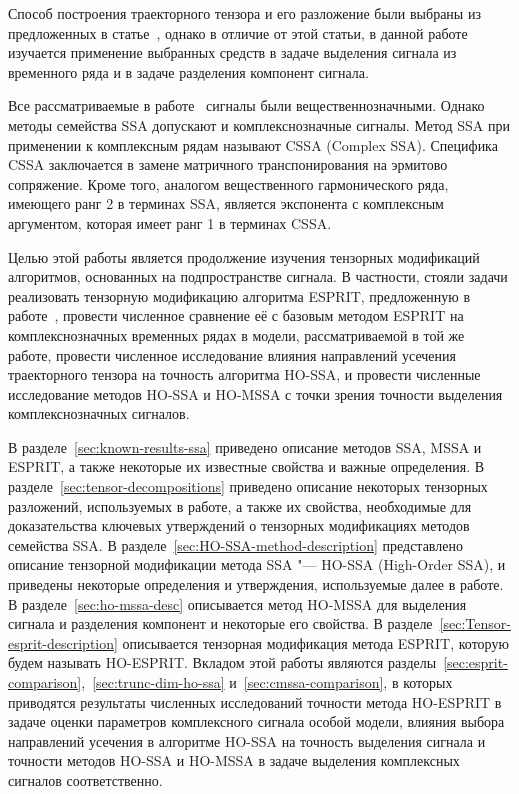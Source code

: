 \documentclass[specialist,
  substylefile=spbu_report.rtx,
subf,href,colorlinks=true, 12pt]{disser}
\theoremstyle{plain}
\theoremstyle{definition}
\theoremstyle{remark}
\begin{document}
Способ построения траекторного тензора и его разложение были
выбраны из предложенных в
статье~\cite{hosvd-hooi-separation}, однако в отличие от этой
статьи, в данной работе изучается применение
выбранных средств в задаче выделения сигнала из временного ряда и в
задаче разделения компонент сигнала.

Все рассматриваемые в работе~\cite{Thesis2024} сигналы были вещественнозначными.
Однако методы семейства SSA допускают и комплекснозначные сигналы.
Метод SSA при применении к комплексным рядам называют CSSA (Complex SSA).
Специфика CSSA заключается в замене матричного
транспонирования на эрмитово сопряжение.
Кроме того, аналогом вещественного гармонического ряда,
имеющего ранг 2 в терминах SSA, является
экспонента с комплексным аргументом, которая
имеет ранг 1 в терминах CSSA.

Целью этой работы является продолжение изучения тензорных модификаций
алгоритмов, основанных на подпространстве сигнала.
В частности, стояли задачи реализовать тензорную модификацию алгоритма
ESPRIT, предложенную в работе~\cite{hosvd-hooi-separation},
провести численное сравнение её с базовым методом
ESPRIT на комплекснозначных временных рядах в модели, рассматриваемой
в той же работе,
провести численное исследование влияния направлений
усечения траекторного тензора на точность алгоритма HO-SSA,
и провести численные исследование методов HO-SSA
и HO-MSSA с точки зрения точности выделения
комплекснозначных сигналов.

В разделе~\ref{sec:known-results-ssa} приведено описание методов
SSA, MSSA и ESPRIT, а также некоторые их
известные свойства и важные определения.
В разделе~\ref{sec:tensor-decompositions} приведено описание
некоторых тензорных разложений, используемых в работе,
а также их свойства, необходимые для доказательства ключевых утверждений о
тензорных модификациях методов семейства SSA.
В разделе~\ref{sec:HO-SSA-method-description}
представлено описание тензорной модификации метода SSA "--- HO-SSA
(High-Order SSA), и приведены некоторые определения и утверждения,
используемые далее в работе.
В разделе~\ref{sec:ho-mssa-desc}
описывается метод HO-MSSA для выделения сигнала и разделения
компонент и некоторые его свойства.
В разделе~\ref{sec:Tensor-esprit-description} описывается
тензорная модификация метода ESPRIT, которую будем называть
HO-ESPRIT.
Вкладом этой работы являются
разделы~\ref{sec:esprit-comparison},~\ref{sec:trunc-dim-ho-ssa}
и~\ref{sec:cmssa-comparison}, в которых приводятся результаты
численных исследований точности метода HO-ESPRIT в задаче оценки
параметров комплексного сигнала особой модели,
влияния выбора направлений усечения в алгоритме HO-SSA
на точность выделения сигнала и
точности методов HO-SSA и HO-MSSA в задаче выделения
комплексных сигналов соответственно.
\end{document}

